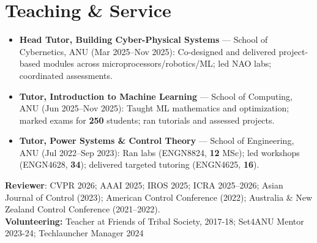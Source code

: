 

\section{Teaching \& Service}

\begin{itemize}[leftmargin=*,itemsep=0pt,parsep=0pt,topsep=0pt]
  \item \textbf{Head Tutor, Building Cyber-Physical Systems} --- School of Cybernetics, ANU (Mar 2025--Nov 2025): Co-designed and delivered project-based modules across microprocessors/robotics/ML; led NAO labs; coordinated assessments.
  \item \textbf{Tutor, Introduction to Machine Learning} --- School of Computing, ANU (Jun 2025--Nov 2025): Taught ML mathematics and optimization; marked exams for \textbf{250} students; ran tutorials and assessed projects.
  \item \textbf{Tutor, Power Systems \& Control Theory} --- School of Engineering, ANU (Jul 2022--Sep 2023): Ran labs (ENGN8824, \textbf{12} MSc); led workshops (ENGN4628, \textbf{34}); delivered targeted tutoring (ENGN4625, \textbf{16}).
\end{itemize}
\textbf{Reviewer}: CVPR 2026; AAAI 2025; IROS 2025; ICRA 2025--2026; Asian Journal of Control (2023); American Control Conference (2022); Australia \& New Zealand Control Conference (2021--2022).\\
\textbf{Volunteering:} Teacher at Friends of Tribal Society, 2017-18; Set4ANU Mentor 2023-24; Techlauncher Manager 2024